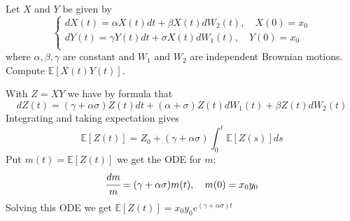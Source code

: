 \documentclass[12pt,a4paper]{exam}
\begin{document}
\begin{questions}
\begin{solution}
\end{solution}

\question Let $X$ and $Y$ be given by
\begin{equation*}
\begin{cases}
dX(t) = \alpha X(t) dt + \beta X(t)dW_2(t), \quad X(0) = x_0\\
dY(t) = \gamma Y(t) dt + \sigma X(t)dW_1(t), \quad Y(0) = x_0\\
\end{cases}
\end{equation*}
where $\alpha, \beta, \gamma$ are constant and $W_1$ and $W_2$ are independent Brownian motions.
Compute $\mathbb{E}[X(t)Y(t)]$.
\fillwithlines{3cm}
\begin{solution}
With $Z=XY$ we have by \ito formula that
\begin{equation*}
dZ(t) = (\gamma+\alpha\sigma)Z(t)dt + (\alpha + \sigma)Z(t)dW_1(t) + \beta Z(t)dW_2(t)
\end{equation*}
Integrating and taking expectation gives
\begin{equation*}
\mathbb{E}[Z(t)] = Z_0 + (\gamma+\alpha\sigma)\int_0^t\mathbb{E}[Z(s)]ds
\end{equation*}
Put $m(t)=\mathbb{E}[Z(t)]$ we get the ODE for $m$:
\begin{equation*}
\cfrac{dm}{m} = (\gamma+\alpha\sigma)m(t),\quad m(0)=x_0y_0
\end{equation*}
Solving this ODE we get $\mathbb{E}[Z(t)]=x_0y_0e^{(\gamma+\alpha\sigma)t}$
\end{solution}



\end{questions}
\end{document}
